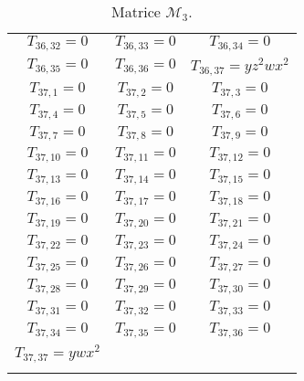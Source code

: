 \begin{longtable}{|c|c|c|}
$T_{36,32}= 0$&

$T_{36,33}= 0$&

$T_{36,34}= 0$\\

$T_{36,35}= 0$&

$T_{36,36}= 0$&

$T_{36,37}= yz^2wx^2$\\

$T_{37,1}= 0$&

$T_{37,2}= 0$&

$T_{37,3}= 0$\\

$T_{37,4}= 0$&

$T_{37,5}= 0$&

$T_{37,6}= 0$\\

$T_{37,7}= 0$&

$T_{37,8}= 0$&

$T_{37,9}= 0$\\

$T_{37,10}= 0$&

$T_{37,11}= 0$&

$T_{37,12}= 0$\\

$T_{37,13}= 0$&

$T_{37,14}= 0$&

$T_{37,15}= 0$\\

$T_{37,16}= 0$&

$T_{37,17}= 0$&

$T_{37,18}= 0$\\

$T_{37,19}= 0$&

$T_{37,20}= 0$&

$T_{37,21}= 0$\\

$T_{37,22}= 0$&

$T_{37,23}= 0$&

$T_{37,24}= 0$\\

$T_{37,25}= 0$&

$T_{37,26}= 0$&

$T_{37,27}= 0$\\

$T_{37,28}= 0$&

$T_{37,29}= 0$&

$T_{37,30}= 0$\\

$T_{37,31}= 0$&

$T_{37,32}= 0$&

$T_{37,33}= 0$\\

$T_{37,34}= 0$&

$T_{37,35}= 0$&

$T_{37,36}= 0$\\

$T_{37,37}= ywx^2$& &\\
\hline
\caption{\label{tab7} Matrice $\mathcal{M}_{3}$.}
\end{longtable}
